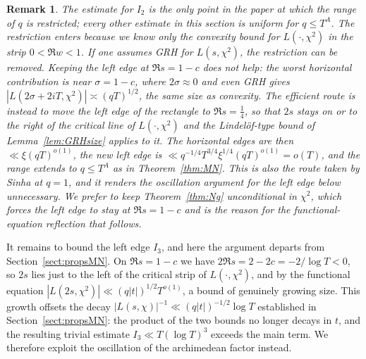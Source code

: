 \documentclass[10pt,a4paper]{amsart}
\newtheorem*{remark}{Remark}
\numberwithin{equation}{section}
\begin{document}
\begin{remark}
The estimate for $I_2$ is the only point in the paper at which the range of $q$ is restricted; every other estimate in this section is uniform for $q\le T^{A}$. The restriction enters because we know only the convexity bound for $L(\cdot,\chi^2)$ in the strip $0<\Re w<1$. If one assumes GRH for $L(s,\chi^2)$, the restriction can be removed. Keeping the left edge at $\Re s=1-c$ does not help: the worst horizontal contribution is near $\sigma=1-c$, where $2\sigma\approx0$ and even GRH gives $|L(2\sigma+2iT,\chi^2)|\asymp(qT)^{1/2}$, the same size as convexity. The efficient route is instead to move the left edge of the rectangle to $\Re s=\tfrac14$, so that $2s$ stays on or to the right of the critical line of $L(\cdot,\chi^2)$ and the Lindel\"of-type bound of Lemma~\ref{lem:GRHsize} applies to it. The horizontal edges are then $\ll\xi(qT)^{o(1)}$, the new left edge is $\ll q^{-1/4}T^{3/4}\xi^{1/4}(qT)^{o(1)}=o(T)$, and the range extends to $q\le T^{A}$ as in Theorem~\ref{thm:MN}. This is also the route taken by Sinha \cite{SinhaThesis} at $q=1$, and it renders the oscillation argument for the left edge below unnecessary. We prefer to keep Theorem~\ref{thm:Ng} unconditional in $\chi^2$, which forces the left edge to stay at $\Re s=1-c$ and is the reason for the functional-equation reflection that follows.
\end{remark}

It remains to bound the left edge $I_3$, and here the argument departs from Section~\ref{sect:propsMN}. On $\Re s=1-c$ we have $2\Re s=2-2c=-2/\log T<0$, so $2s$ lies just to the left of the critical strip of $L(\cdot,\chi^2)$, and by the functional equation $|L(2s,\chi^2)|\ll(q|t|)^{1/2}T^{o(1)}$, a bound of genuinely growing size. This growth offsets the decay $|L(s,\chi)|^{-1}\ll(q|t|)^{-1/2}\log T$ established in Section~\ref{sect:propsMN}: the product of the two bounds no longer decays in $t$, and the resulting trivial estimate $I_3\ll T(\log T)^3$ exceeds the main term. We therefore exploit the oscillation of the archimedean factor instead.
\end{document}
